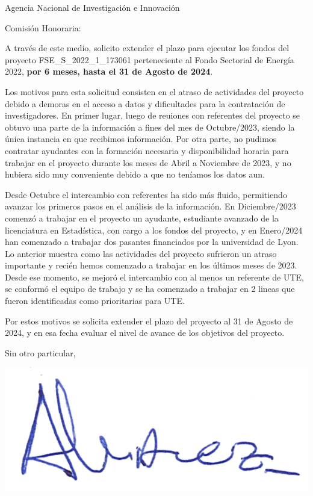 \documentclass{letter}\usepackage[]{graphicx}\usepackage[]{xcolor}
\date{Montevideo, 4 de Marzo de 2024}
\begin{document}
\begin{letter}{Agencia Nacional de Investigación e Innovación}
\opening{Comisión Honoraria:}

A través de este medio, solicito extender el plazo para ejecutar los fondos del proyecto FSE\_S\_2022\_1\_173061 perteneciente al Fondo Sectorial de Energía 2022,
\textbf{por 6 meses, hasta el 31 de Agosto de 2024}. 

Los motivos para esta solicitud consisten en el atraso de actividades del proyecto debido a demoras en el acceso a datos y dificultades para la contratación de investigadores. En primer lugar, luego de reuiones con referentes del proyecto se obtuvo una parte de la información a fines del mes de Octubre/2023, siendo la única instancia en que recibimos información. Por otra parte, no pudimos contratar ayudantes con la formación necesaria y disponibilidad horaria para trabajar en el proyecto durante los meses de Abril a Noviembre de 2023, y no hubiera sido muy conveniente debido a que no teníamos los datos aun.

Desde Octubre el intercambio con referentes ha sido más fluido, permitiendo avanzar los primeros pasos en el análisis de la información. En Diciembre/2023 comenzó a trabajar en el proyecto un ayudante, estudiante avanzado de la licenciatura en Estadística, con cargo a los fondos del proyecto, y en Enero/2024 han comenzado a trabajar dos pasantes financiados por la universidad de Lyon.  Lo anterior muestra como las actividades del proyecto sufrieron un atraso importante y recién hemos comenzado a trabajar en los últimos meses de 2023. Desde ese momento, se mejoró el intercambio con al menos un referente de UTE, se conformó el equipo de trabajo y se ha comenzado a trabajar en 2 lineas que fueron identificadas como prioritarias para UTE. 

Por estos motivos se solicita extender el plazo del proyecto al 31 de Agosto de 2024, y en esa fecha evaluar el nivel de avance de los objetivos del proyecto.  


\closing{Sin otro particular,}
\begin{center}
\includegraphics[scale=.5]{../firma_nacho}
\end{center}

\end{letter}
\end{document}
